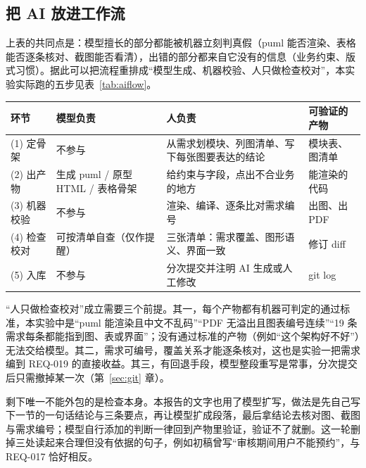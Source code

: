 \subsection{把 AI 放进工作流}

上表的共同点是：模型擅长的部分都能被机器立刻判真假（puml 能否渲染、表格能否逐条核对、截图能否看清），出错的部分都来自它没有的信息（业务约束、版式习惯）。据此可以把流程重排成“模型生成、机器校验、人只做检查校对”，本实验实际跑的五步见表~\ref{tab:aiflow}。

\begin{center}
\begin{minipage}{\textwidth}\centering
{}\label{tab:aiflow}
\renewcommand{\arraystretch}{1.12}
\begin{tabularx}{\textwidth}{@{}p{2.05cm}Yp{4.05cm}p{2.6cm}@{}}
\toprule
环节 & 模型负责 & 人负责 & 可验证的产物 \\
\midrule
(1) 定骨架 & 不参与 & 从需求划模块、列图清单、写下每张图要表达的结论 & 模块表、图清单 \\
(2) 出产物 & 生成 puml / 原型 HTML / 表格骨架 & 给约束与字段，点出不合业务的地方 & 能渲染的代码 \\
(3) 机器校验 & 不参与 & 渲染、编译、逐条比对需求编号 & 出图、出 PDF \\
(4) 检查校对 & 可按清单自查（仅作提醒） & 三张清单：需求覆盖、图形语义、界面一致 & 修订 diff \\
(5) 入库 & 不参与 & 分次提交并注明 AI 生成或人工修改 & git log \\
\bottomrule
\end{tabularx}
\end{minipage}
\end{center}

“人只做检查校对”成立需要三个前提。其一，每个产物都有机器可判定的通过标准，本实验中是“puml 能渲染且中文不乱码”“PDF 无溢出且图表编号连续”“19 条需求每条都能指到图、表或界面”；没有通过标准的产物（例如“这个架构好不好”）无法交给模型。其二，需求可编号，覆盖关系才能逐条核对，这也是实验一把需求编到 REQ-019 的直接收益。其三，有回退手段，模型整段重写是常事，分次提交后只需撤掉某一次（第~\ref{sec:git} 章）。

剩下唯一不能外包的是检查本身。本报告的文字也用了模型扩写，做法是先自己写下一节的一句话结论与三条要点，再让模型扩成段落，最后拿结论去核对图、截图与需求编号；模型自行添加的判断一律回到产物里验证，验证不了就删。这一轮删掉三处读起来合理但没有依据的句子，例如初稿曾写“审核期间用户不能预约”，与 REQ-017 恰好相反。


